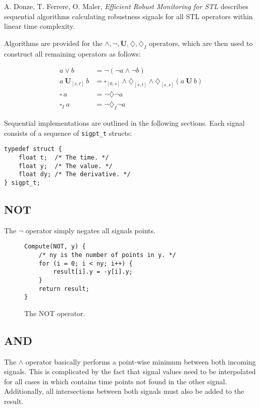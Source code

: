 \documentclass[a4paper,10pt]{article}
\renewcommand{\And}{\wedge}
\newcommand{\Or}{\vee}
\newcommand{\Neg}{\neg}
\newcommand{\Until}{\mathbf{U}}
\newcommand{\Evtl}{\diamondsuit}
\newcommand{\Alw}{\square}
\newcommand{\Bevtl}{\diamondsuit_I}
\newcommand{\Balw}{\square_I}
\begin{document}
A. Donze, T. Ferrere, O. Maler, \emph{Efficient Robust Monitoring for STL} describes
sequential algorithms calculating robustness signals for all STL operators within linear
time complexity.

Algorithms are provided for the $\And, \Neg, \Until, \Evtl, \Bevtl$ operators, which are then used
to construct all remaining operators as follows:

\begin{align}
a \Or b &= \Neg (\Neg a \And \Neg b) \\
a \: \Until_{[s, t]} \: b &= \Alw_{[0, s]} \And \Evtl_{[s, t]} \And \Evtl_{[s, s]} (a \: \Until \: b)\\
\Alw \:  a &= \Neg \Evtl  \Neg a \\
\Balw \: a &= \Neg \Bevtl \Neg a
\end{align}

Sequential implementations are outlined in the following sections. Each signal consists
of a sequence of \lstinline|sigpt_t| structs:

\begin{lstlisting}
typedef struct {
    float t;  /* The time. */
    float y;  /* The value. */
    float dy; /* The derivative. */
} sigpt_t;
\end{lstlisting}

\subsection{NOT}

The $\Neg$ operator simply negates all signals points.

\begin{figure}[ht]
\begin{lstlisting}
Compute(NOT, y) {
    /* ny is the number of points in y. */
    for (i = 0; i < ny; i++) {
        result[i].y = -y[i].y;
    }
    return result;
}
\end{lstlisting}
\label{fig:not}
\caption{The NOT operator.}
\end{figure}

\subsection{AND}

The $\And$ operator basically performs a point-wise minimum between both incoming signals.
This is complicated by the fact that signal values need to be interpolated for all
cases in which contains time points not found in the other signal. Additionally,
all intersections between both signals must also be added to the result.
\end{document}
